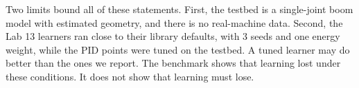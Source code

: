 Two limits bound all of these statements. First, the testbed is a
single-joint boom model with estimated geometry, and there is no real-machine
data. Second, the Lab 13 learners ran close to their library defaults, with
3 seeds and one energy weight, while the PID points were tuned on the testbed. %
A tuned learner may do better than the ones we report. The benchmark shows
that learning lost under these conditions. It does not show that learning must lose.
